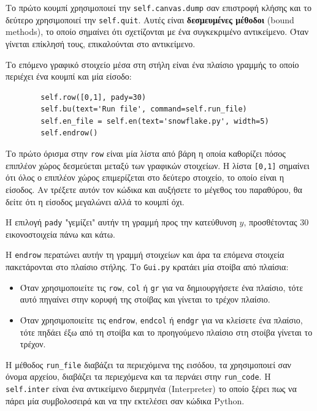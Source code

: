\documentclass[10pt]{book}
\begin{document}
Το πρώτο κουμπί χρησιμοποιεί την {\tt self.canvas.dump} σαν επιστροφή κλήσης και το
δεύτερο χρησιμοποιεί την {\tt self.quit}.  Αυτές είναι {\bf δεσμευμένες μέθοδοι} (bound methods),
το οποίο σημαίνει ότι σχετίζονται με ένα συγκεκριμένο αντικείμενο.  Όταν γίνεται επίκλησή
τους, επικαλούνται στο αντικείμενο.

Το επόμενο γραφικό στοιχείο μέσα στη στήλη είναι ένα πλαίσιο γραμμής το οποίο περιέχει 
ένα κουμπί και μία είσοδο:

\begin{verbatim}
        self.row([0,1], pady=30)
        self.bu(text='Run file', command=self.run_file)
        self.en_file = self.en(text='snowflake.py', width=5)
        self.endrow()
\end{verbatim}
%
Το πρώτο όρισμα στην {\tt row} είναι μία λίστα από βάρη η οποία καθορίζει πόσος
επιπλέον χώρος δεσμεύεται μεταξύ των γραφικών στοιχείων.  Η λίστα {\tt [0,1]} σημαίνει
ότι όλος ο επιπλέον χώρος επιμερίζεται στο δεύτερο στοιχείο, το οποίο είναι η είσοδος.
Αν τρέξετε αυτόν τον κώδικα και αυξήσετε το μέγεθος του παραθύρου, 
θα δείτε ότι η είσοδος μεγαλώνει αλλά το κουμπί όχι.

Η επιλογή {\tt pady} "γεμίζει" αυτήν τη γραμμή προς την κατεύθυνση $y$, 
προσθέτοντας 30 εικονοστοιχεία πάνω και κάτω.

Η {\tt endrow} περατώνει αυτήν τη γραμμή στοιχείων και άρα τα επόμενα στοιχεία 
πακετάρονται στο πλαίσιο στήλης.  Το {\tt Gui.py} κρατάει μία στοίβα από πλαίσια:


\begin{itemize}

\item  Όταν χρησιμοποιείτε τις {\tt row}, {\tt col} ή {\tt gr} για
να δημιουργήσετε ένα πλαίσιο, τότε αυτό πηγαίνει στην κορυφή της στοίβας και γίνεται 
το τρέχον πλαίσιο.

\item Όταν χρησιμοποιείτε τις {\tt endrow}, {\tt endcol} ή {\tt endgr} για 
να κλείσετε ένα πλαίσιο, τότε πηδάει έξω από τη στοίβα και το προηγούμενο πλαίσιο στη στοίβα
γίνεται το τρέχον.

\end{itemize}

Η μέθοδος \verb"run_file" διαβάζει τα περιεχόμενα της εισόδου, τα χρησιμοποιεί σαν 
όνομα αρχείου, διαβάζει τα περιεχόμενα και τα περνάει στην \verb"run_code".  Η
{\tt self.inter} είναι ένα αντικείμενο διερμηνέα (Interpreter) το οποίο ξέρει
πως να πάρει μία συμβολοσειρά και να την εκτελέσει σαν κώδικα Python.
\end{document}
